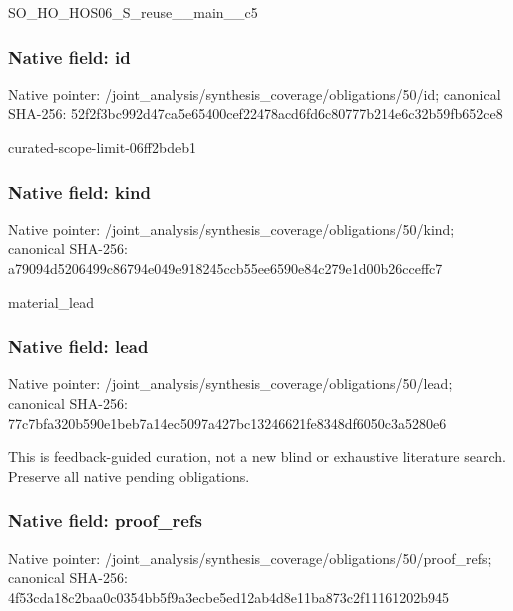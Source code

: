 \documentclass[10pt,a4paper]{article}
\begin{document}
\begingroup\raggedright\sloppy SO\_\allowbreak{}HO\_\allowbreak{}HOS06\_\allowbreak{}S\_\allowbreak{}reuse\_\allowbreak{}\_\allowbreak{}main\_\allowbreak{}\_\allowbreak{}c5\par\endgroup

\subsubsection{Native field: id}
Native pointer: /joint\_\allowbreak{}analysis/synthesis\_\allowbreak{}coverage/obligations/50/id; canonical SHA-256: 52f2f3bc992d47ca5e65400cef22478acd6fd6c80777b214e6c32b59fb652ce8

\begingroup\raggedright\sloppy curated-scope-limit-06ff2bdeb1\par\endgroup

\subsubsection{Native field: kind}
Native pointer: /joint\_\allowbreak{}analysis/synthesis\_\allowbreak{}coverage/obligations/50/kind; canonical SHA-256: a79094d5206499c86794e049e918245ccb55ee6590e84c279e1d00b26cceffc7

\begingroup\raggedright\sloppy material\_\allowbreak{}lead\par\endgroup

\subsubsection{Native field: lead}
Native pointer: /joint\_\allowbreak{}analysis/synthesis\_\allowbreak{}coverage/obligations/50/lead; canonical SHA-256: 77c7bfa320b590e1beb7a14ec5097a427bc13246621fe8348df6050c3a5280e6

\begingroup\raggedright\sloppy This is feedback-guided curation,\allowbreak{} not a new blind or exhaustive literature search. Preserve all native pending obligations.\par\endgroup

\subsubsection{Native field: proof\_\allowbreak{}refs}
Native pointer: /joint\_\allowbreak{}analysis/synthesis\_\allowbreak{}coverage/obligations/50/proof\_\allowbreak{}refs; canonical SHA-256: 4f53cda18c2baa0c0354bb5f9a3ecbe5ed12ab4d8e11ba873c2f11161202b945
\end{document}

